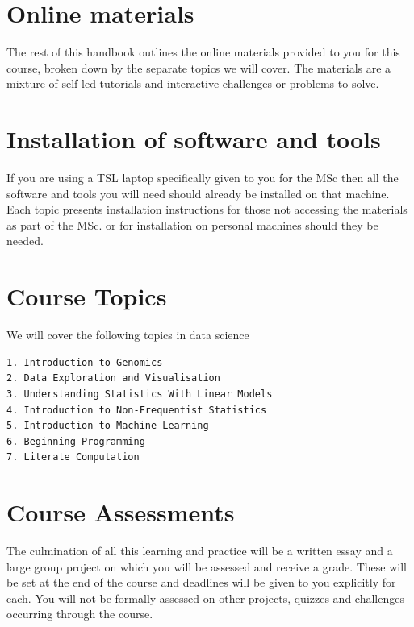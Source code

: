 \documentclass[
]{book}
\begin{document}
\hypertarget{online-materials}{%
\section{Online materials}\label{online-materials}}

The rest of this handbook outlines the online materials provided to you for this course, broken down by the separate topics we will cover. The materials are a mixture of self-led tutorials and interactive challenges or problems to solve.

\hypertarget{installation-of-software-and-tools}{%
\section{Installation of software and tools}\label{installation-of-software-and-tools}}

If you are using a TSL laptop specifically given to you for the MSc then all the software and tools you will need should already be installed on that machine. Each topic presents installation instructions for those not accessing the materials as part of the MSc. or for installation on personal machines should they be needed.

\hypertarget{course-topics}{%
\section{Course Topics}\label{course-topics}}

We will cover the following topics in data science

\begin{verbatim}
1. Introduction to Genomics
2. Data Exploration and Visualisation
3. Understanding Statistics With Linear Models
4. Introduction to Non-Frequentist Statistics
5. Introduction to Machine Learning
6. Beginning Programming
7. Literate Computation
\end{verbatim}

\hypertarget{course-assessments}{%
\section{Course Assessments}\label{course-assessments}}

The culmination of all this learning and practice will be a written essay and a large group project on which you will be assessed and receive a grade. These will be set at the end of the course and deadlines will be given to you explicitly for each. You will not be formally assessed on other projects, quizzes and challenges occurring through the course.
\end{document}
